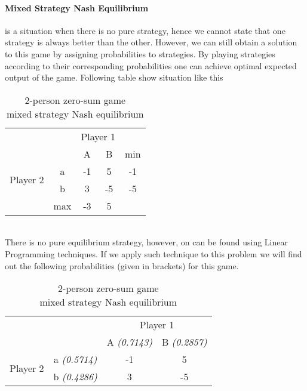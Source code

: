 \documentclass[10pt, a4paper]{report}
\begin{document}
\paragraph{Mixed Strategy Nash Equilibrium} is a situation when there is no pure strategy, hence we cannot state that one strategy is always better than the other. However, we can still obtain a solution to this game by assigning probabilities to strategies. By playing strategies according to their corresponding probabilities one can achieve optimal expected output of the game. Following table show situation like this
\begin{table}[ht!]
	\hspace{-2em}
	\centering
	\begin{tabular}{cccc|c}
		& & \multicolumn{2}{c}{Player 1} &                                \\ \cline{3-4}
		& & A & \multicolumn{1}{c}{B} & min                               \\ \cline{3-4}
		\multirow{2}{*}{Player 2} & \multicolumn{1}{|c|}{a} & -1 & 5 & -1 \\
		& \multicolumn{1}{|c|}{b} & 3 & -5 & -5                           \\ \cline{3-4}
		& max & -3 & \multicolumn{1}{c}{5} &
	\end{tabular}
	\caption{2-person zero-sum game\\mixed strategy Nash equilibrium}
\end{table}
\\
There is no pure equilibrium strategy, however, on can be found using Linear Programming techniques. If we apply such technique to this problem we will find out the following probabilities (given in brackets) for this game.
\begin{table}[ht!]
	\hspace{-2em}
	\centering
	\begin{tabular}{cccc|}
		& & \multicolumn{2}{c}{Player 1}                                               \\ \cline{3-4}
		& & A \textit{(0.7143)}& \multicolumn{1}{c}{B \textit{(0.2857)}}               \\ \cline{3-4}
		\multirow{2}{*}{Player 2} & \multicolumn{1}{|c|}{a \textit{(0.5714)}} & -1 & 5 \\
		& \multicolumn{1}{|c|}{b \textit{(0.4286)}} & 3 & -5                           \\ \cline{3-4}
	\end{tabular}
	\caption{2-person zero-sum game\\mixed strategy Nash equilibrium}
\end{table}
\end{document}
